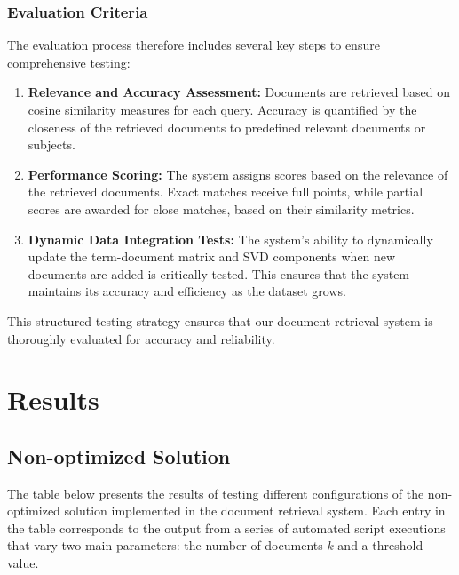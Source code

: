 \documentclass[12pt,a4paper]{article}
\begin{document}
\subsubsection{Evaluation Criteria}
The evaluation process therefore includes several key steps to ensure comprehensive testing:

\begin{enumerate}
    \item \textbf{Relevance and Accuracy Assessment:} Documents are retrieved based on cosine similarity measures for each query. Accuracy is quantified by the closeness of the retrieved documents to predefined relevant documents or subjects.
    \item \textbf{Performance Scoring:} The system assigns scores based on the relevance of the retrieved documents. Exact matches receive full points, while partial scores are awarded for close matches, based on their similarity metrics.
    \item \textbf{Dynamic Data Integration Tests:} The system's ability to dynamically update the term-document matrix and SVD components when new documents are added is critically tested. This ensures that the system maintains its accuracy and efficiency as the dataset grows.
\end{enumerate}

\noindent
This structured testing strategy ensures that our document retrieval system is thoroughly evaluated for accuracy and reliability.

\newpage

\section{Results}

\subsection{Non-optimized Solution}

The table below presents the results of testing different configurations of the non-optimized solution implemented in the document retrieval system. Each entry in the table corresponds to the output from a series of automated script executions that vary two main parameters: the number of documents $k$ and a threshold value.
\end{document}
